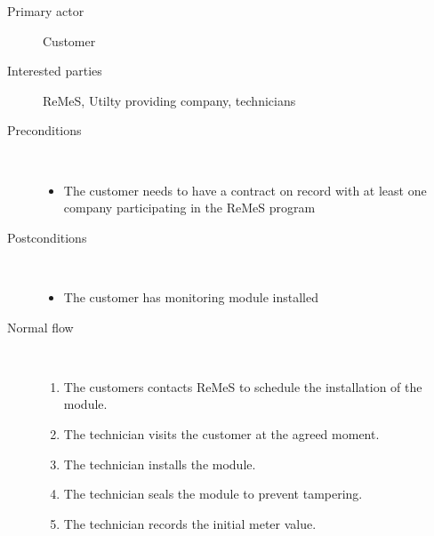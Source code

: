 \begin{description}
	\item[Primary actor] Customer
	\item[Interested parties] ReMeS, Utilty providing company, technicians
	\item[Preconditions] \ 
	\begin{itemize}
		\item The customer needs to have a contract on record with at least one
		company participating in the ReMeS program
	\end{itemize}
	\item[Postconditions] \ 
	\begin{itemize}
		\item The customer has monitoring module installed
	\end{itemize}
	\item[Normal flow] \ 
	\begin{enumerate}
		\item The customers contacts ReMeS to schedule the installation of the module.
		\item The technician visits the customer at the agreed moment.
		\item The technician installs the module.
		\item The technician seals the module to prevent tampering.
		\item The technician records the initial meter value.
	\end{enumerate}
\end{description}
